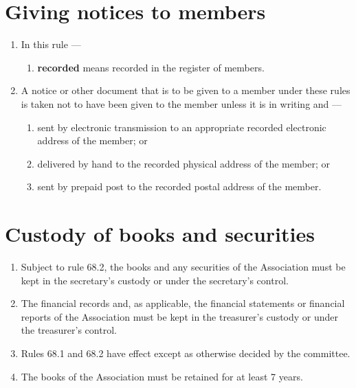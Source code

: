 \hypertarget{giving-notices-to-members}{%
\section{Giving notices to members}\label{giving-notices-to-members}}

\begin{enumerate}

\item In this rule ---

  \begin{enumerate}
  
  \item \textbf{recorded} means recorded in the register of members.
  \end{enumerate}
\item A notice or other document that is to be given to a member under these rules is taken not to have been given to the member unless it is in writing and ---

  \begin{enumerate}
  
  \item sent by electronic transmission to an appropriate recorded electronic address of the member; or
  \item delivered by hand to the recorded physical address of the member; or
  \item sent by prepaid post to the recorded postal address of the member.
  \end{enumerate}
\end{enumerate}

\hypertarget{custody-of-books-and-securities}{%
\section{Custody of books and securities}\label{custody-of-books-and-securities}}

\begin{enumerate}

\item Subject to rule 68.2, the books and any securities of the Association must be kept in the secretary's custody or under the secretary's control.
\item The financial records and, as applicable, the financial statements or financial reports of the Association must be kept in the treasurer's custody or under the treasurer's control.
\item Rules 68.1 and 68.2 have effect except as otherwise decided by the committee.
\item The books of the Association must be retained for at least 7 years.
\end{enumerate}

